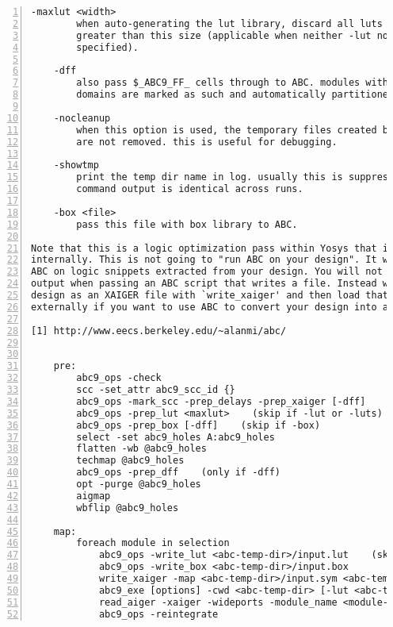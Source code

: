 \begin{lstlisting}[numbers=left,frame=single]
    -maxlut <width>
        when auto-generating the lut library, discard all luts equal to or
        greater than this size (applicable when neither -lut nor -luts is
        specified).

    -dff
        also pass $_ABC9_FF_ cells through to ABC. modules with many clock
        domains are marked as such and automatically partitioned by ABC.

    -nocleanup
        when this option is used, the temporary files created by this pass
        are not removed. this is useful for debugging.

    -showtmp
        print the temp dir name in log. usually this is suppressed so that the
        command output is identical across runs.

    -box <file>
        pass this file with box library to ABC.

Note that this is a logic optimization pass within Yosys that is calling ABC
internally. This is not going to "run ABC on your design". It will instead run
ABC on logic snippets extracted from your design. You will not get any useful
output when passing an ABC script that writes a file. Instead write your full
design as an XAIGER file with `write_xaiger' and then load that into ABC
externally if you want to use ABC to convert your design into another format.

[1] http://www.eecs.berkeley.edu/~alanmi/abc/


    pre:
        abc9_ops -check
        scc -set_attr abc9_scc_id {}
        abc9_ops -mark_scc -prep_delays -prep_xaiger [-dff]    (option for -dff)
        abc9_ops -prep_lut <maxlut>    (skip if -lut or -luts)
        abc9_ops -prep_box [-dff]    (skip if -box)
        select -set abc9_holes A:abc9_holes
        flatten -wb @abc9_holes
        techmap @abc9_holes
        abc9_ops -prep_dff    (only if -dff)
        opt -purge @abc9_holes
        aigmap
        wbflip @abc9_holes

    map:
        foreach module in selection
            abc9_ops -write_lut <abc-temp-dir>/input.lut    (skip if '-lut' or '-luts')
            abc9_ops -write_box <abc-temp-dir>/input.box
            write_xaiger -map <abc-temp-dir>/input.sym <abc-temp-dir>/input.xaig
            abc9_exe [options] -cwd <abc-temp-dir> [-lut <abc-temp-dir>/input.lut] -box <abc-temp-dir>/input.box
            read_aiger -xaiger -wideports -module_name <module-name>$abc9 -map <abc-temp-dir>/input.sym <abc-temp-dir>/output.aig
            abc9_ops -reintegrate
\end{lstlisting}

